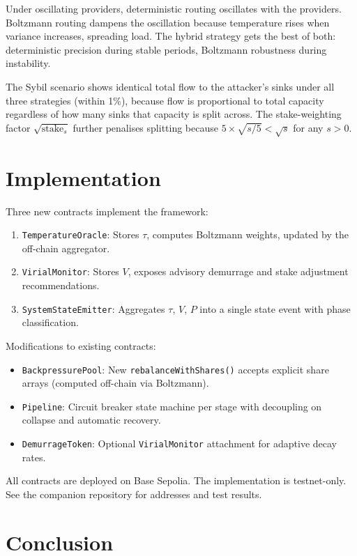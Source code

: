 \documentclass[11pt]{article}
\theoremstyle{definition}
\theoremstyle{remark}
\begin{document}
Under oscillating providers, deterministic routing oscillates with the
providers. Boltzmann routing dampens the oscillation because
temperature rises when variance increases, spreading load. The hybrid
strategy gets the best of both: deterministic precision during stable
periods, Boltzmann robustness during instability.

The Sybil scenario shows identical total flow to the
attacker's sinks under all three strategies (within 1\%), because
flow is proportional to total capacity regardless of how many sinks
that capacity is split across. The stake-weighting factor
$\sqrt{\text{stake}_s}$ further penalises splitting because
$5 \times \sqrt{s/5} < \sqrt{s}$ for any $s > 0$.

\section{Implementation}

Three new contracts implement the framework:

\begin{enumerate}
\item \texttt{TemperatureOracle}: Stores $\tau$, computes
  Boltzmann weights, updated by the off-chain aggregator.
\item \texttt{VirialMonitor}: Stores $V$, exposes advisory
  demurrage and stake adjustment recommendations.
\item \texttt{SystemStateEmitter}: Aggregates $\tau$, $V$, $P$
  into a single state event with phase classification.
\end{enumerate}

Modifications to existing contracts:
\begin{itemize}
\item \texttt{BackpressurePool}: New \texttt{rebalanceWithShares()}
  accepts explicit share arrays (computed off-chain via Boltzmann).
\item \texttt{Pipeline}: Circuit breaker state machine per stage with
  decoupling on collapse and automatic recovery.
\item \texttt{DemurrageToken}: Optional \texttt{VirialMonitor}
  attachment for adaptive decay rates.
\end{itemize}

All contracts are deployed on Base Sepolia. The implementation is
testnet-only. See the companion repository for addresses and test
results.

\section{Conclusion}
\end{document}
